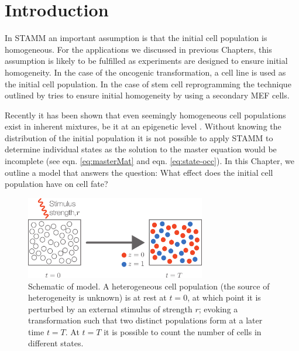 
\section{Introduction}
\label{sec:introduction-cell}


In STAMM an important assumption is that the initial cell population is homogeneous. For the applications we discussed in previous Chapters, this assumption is likely to be fulfilled  as experiments are designed to ensure initial homogeneity. In the case of the oncogenic transformation, a cell line is used as the initial cell population. In the case of stem cell reprogramming the technique outlined by \cite{Hanna:2009ix} tries to ensure initial homogeneity  by using a secondary MEF cells.

Recently it has been shown that even seemingly homogeneous cell populations exist in inherent mixtures, be it at an epigenetic level \citep{Heng:2009em,Gerlinger:2012wu}. Without knowing the distribution of the initial population it is not possible to apply STAMM to determine individual states as the solution to the master equation would be incomplete (see eqn.   \ref{eq:masterMat} and eqn.   \ref{eq:state-occ}). In this Chapter, we outline a model that answers the question: What effect does the initial cell population have on cell fate?


\begin{figure}[h]
  \centering
  \includegraphics[width=0.7\textwidth]{pics/cell-cycle-model.pdf}
  \caption{Schematic of model. A heterogeneous cell population (the source of heterogeneity is unknown) is at rest at $t=0$, at which point it is perturbed by an external stimulus of strength $r$; evoking a transformation such that two distinct populations form at a later time $t=T$. At $t=T$ it is possible to count the number of cells in different states. }
  \label{fig:cell-cycle-model}
\end{figure}

